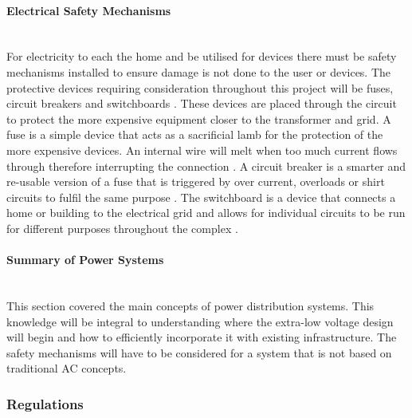 \paragraph{Electrical Safety Mechanisms}
~\\
For electricity to each the home and be utilised for devices there must be safety mechanisms installed to ensure damage is not done to the user or devices. The protective devices requiring consideration throughout this project will be fuses, circuit breakers and switchboards \cite{UnitedStatesDepartmentoftheInterior2000}. These devices are placed through the circuit to protect the more expensive equipment closer to the transformer and grid. A fuse is a simple device that acts as a sacrificial lamb for the protection of the more expensive devices. An internal wire will melt when too much current flows through therefore interrupting the connection \cite{UnitedStatesDepartmentoftheInterior2000}. A circuit breaker is a smarter and re-usable version of a fuse that is triggered by over current, overloads or shirt circuits to fulfil the same purpose \cite{UnitedStatesDepartmentoftheInterior2000}. The switchboard is a device that connects a home or building to the electrical grid and allows for individual circuits to be run for different purposes throughout the complex \cite{UnitedStatesDepartmentoftheInterior2000}.

\paragraph{Summary of Power Systems}
~\\
This section covered the main concepts of power distribution systems. This knowledge will be integral to understanding where the extra-low voltage design will begin and how to efficiently incorporate it with existing infrastructure. The safety mechanisms will have to be considered for a system that is not based on traditional AC concepts.  



\subsubsection{Regulations}

